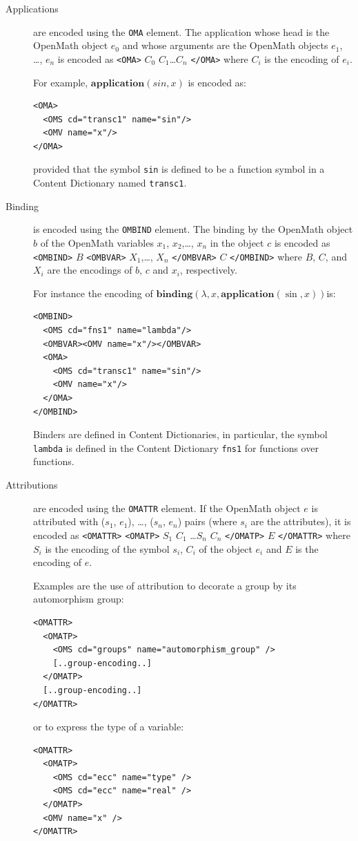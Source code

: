 \documentclass{report}
\def\OM{OpenMath\xspace}
\def\application#1{\mathbf{application}(#1)}
\def\binding#1{\mathbf{binding}(#1)}
\begin{document}
\begin{description}
\item[Applications] are encoded using the \lstinline|OMA| element. The
  application whose head is the \OM object $e_0$ and whose arguments
  are the \OM objects $e_1$, \ldots, $e_n$ is encoded as \lstinline|<OMA>|
  $C_0$ $C_1$\ldots $C_n$ \lstinline|</OMA>| where $C_i$ is the encoding of
  $e_i$.


For example, $\application{sin,x}$ is encoded as:
\begin{lstlisting}
<OMA>  
  <OMS cd="transc1" name="sin"/> 
  <OMV name="x"/>  
</OMA>
\end{lstlisting}
  provided that the symbol \lstinline|sin| is defined to be a function
  symbol in a Content Dictionary named \lstinline|transc1|.
\item[Binding] is encoded using the \lstinline|OMBIND| element.  The binding by the \OM
  object $b$ of the \OM variables $x_1$, $x_2$,\ldots, $x_n$ in the object $c$ is encoded
  as \lstinline|<OMBIND>| $B$ \lstinline|<OMBVAR>| $X_1$,\ldots, $X_n$
  \lstinline|</OMBVAR>| $C$ \lstinline|</OMBIND>| where $B$, $C$, and $X_i$ are the
  encodings of $b$, $c$ and $x_i$, respectively.

  For instance the encoding of $\binding{\lambda,x,\application{\sin,x}}$is:
\begin{lstlisting}
<OMBIND>
  <OMS cd="fns1" name="lambda"/>  
  <OMBVAR><OMV name="x"/></OMBVAR>  
  <OMA>
    <OMS cd="transc1" name="sin"/> 
    <OMV name="x"/>  
  </OMA>
</OMBIND>
\end{lstlisting}
  
Binders are defined in  Content Dictionaries, in particular,
  the symbol \lstinline|lambda| is defined in the Content Dictionary
  \lstinline|fns1| for functions over functions.
\item[Attributions] are encoded using the \lstinline|OMATTR| element.  If
  the \OM object $e$ is attributed with ($s_1$, $e_1$), \ldots, 
  ($s_n$, $e_n$) pairs (where $s_i$ are the attributes), it is encoded
  as \lstinline|<OMATTR>| \lstinline|<OMATP>| $S_1$ $C_1$ \ldots $S_n$ $C_n$ \lstinline|</OMATP>| $E$ \lstinline|</OMATTR>| where $S_i$ is the encoding of the
  symbol $s_i$, $C_i$ of the object $e_i$ and $E$ is the encoding of
  $e$.


Examples are the use of attribution to decorate a group by its
  automorphism group:
\begin{lstlisting}
<OMATTR>    
  <OMATP>
    <OMS cd="groups" name="automorphism_group" />  
    [..group-encoding..] 
  </OMATP>  
  [..group-encoding..] 
</OMATTR>
\end{lstlisting}
or to express the type of a variable:
\begin{lstlisting}
<OMATTR>    
  <OMATP>
    <OMS cd="ecc" name="type" /> 
    <OMS cd="ecc" name="real" />
  </OMATP> 
  <OMV name="x" />
</OMATTR>
\end{lstlisting}


\end{description}
\end{document}
